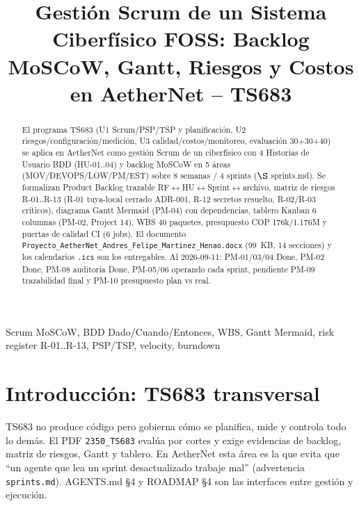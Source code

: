 \documentclass[conference]{IEEEtran}
\begin{document}
\title{Gestión Scrum de un Sistema Ciberfísico FOSS: Backlog MoSCoW, Gantt, Riesgos y Costos en AetherNet -- TS683}
\author{
\and
{}
}
\maketitle

\begin{abstract}
El programa TS683 (U1 Scrum/PSP/TSP y planificación, U2 riesgos/configuración/medición, U3 calidad/costos/monitoreo, evaluación 30+30+40) se aplica en AetherNet como gestión Scrum de un ciberfísico con 4 Historias de Usuario BDD (HU-01..04) y backlog MoSCoW en 5 áreas (MOV/DEVOPS/LOW/PM/EST) sobre 8 semanas / 4 sprints ($\S$ sprints.md). Se formalizan Product Backlog trazable RF$\leftrightarrow$HU$\leftrightarrow$Sprint$\leftrightarrow$archivo, matriz de riesgos R-01..R-13 (R-01 tuya-local cerrado ADR-001, R-12 secretos resuelto, R-02/R-03 críticos), diagrama Gantt Mermaid (PM-04) con dependencias, tablero Kanban 6 columnas (PM-02, Project 14), WBS 40 paquetes, presupuesto COP 176k/1.176M y puertas de calidad CI (6 jobs). El documento \texttt{Proyecto\_AetherNet\_\-Andres\_Felipe\_\-Martinez\_Henao.docx} (99~KB, 14 secciones) y los calendarios \texttt{.ics} son los entregables. Al 2026-09-11: PM-01/03/04 Done, PM-02 Done, PM-08 auditoría Done, PM-05/06 operando cada sprint, pendiente PM-09 trazabilidad final y PM-10 presupuesto plan vs real.
\end{abstract}
\begin{IEEEkeywords}
Scrum MoSCoW, BDD Dado/Cuando/Entonces, WBS, Gantt Mermaid, risk register R-01..R-13, PSP/TSP, velocity, burndown
\end{IEEEkeywords}

\section{Introducción: TS683 transversal}
TS683 no produce código pero gobierna cómo se planifica, mide y controla todo lo demás. El PDF \texttt{2350\_TS683} evalúa por cortes y exige evidencias de backlog, matriz de riesgos, Gantt y tablero. En AetherNet esta área es la que evita que ``un agente que lea un sprint desactualizado trabaje mal'' (advertencia \texttt{sprints.md}). AGENTS.md \S4 y ROADMAP \S4 son las interfaces entre gestión y ejecución.
\end{document}
